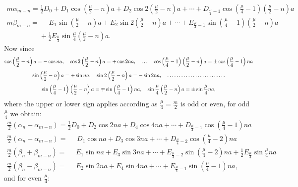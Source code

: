 \begin{landscape}
\[
\begin{array}{l}
m\alpha_{m-n} = \tfrac{1}{2}D_0 + D_1\cos\left(\frac{\mu}{2}-n\right)a + D_2\cos 2\left(\frac{\mu}{2}-n\right)a + \cdots + D_{\frac{\mu}{4}-1}\cos\left(\frac{\mu}{4}-1\right)\left(\frac{\mu}{2}-n\right)a \\[4pt]
m\beta_{m-n} = \phantom{{}={}} E_1\sin\left(\frac{\mu}{2}-n\right)a + E_2\sin 2\left(\frac{\mu}{2}-n\right)a + \cdots + E_{\frac{\mu}{4}-1}\sin\left(\frac{\mu}{4}-1\right)\left(\frac{\mu}{2}-n\right)a \\[4pt]
\phantom{m\beta_{m-n} = {}} + \tfrac{1}{2}E_{\frac{\mu}{4}}\sin\frac{\mu}{4}\left(\frac{\mu}{2}-n\right)a.
\end{array}
\]
Now since
\[
\begin{gathered}
\cos\left(\frac{\mu}{2}-n\right)a = -\cos na, \quad \cos 2\left(\frac{\mu}{2}-n\right)a = +\cos 2na, \quad \ldots \quad \cos\left(\frac{\mu}{4}-1\right)\left(\frac{\mu}{2}-n\right)a = \pm\cos\left(\frac{\mu}{4}-1\right)na\\[4pt]
\sin\left(\frac{\mu}{2}-n\right)a = +\sin na, \quad \sin 2\left(\frac{\mu}{2}-n\right)a = -\sin 2na, \quad \mathord{.}\,\mathord{.}\,\mathord{.}\,\mathord{.}\,\mathord{.}\,\mathord{.}\,\mathord{.}\,\mathord{.}\,\mathord{.}\,\mathord{.}\,\mathord{.}\,\mathord{.}\,\mathord{.}\,\mathord{.}\,\mathord{.}\,\mathord{.}\,\mathord{.}\,\mathord{.}\,\mathord{.}\,\mathord{.}\,\mathord{.}\,\mathord{.}\,\mathord{.}\,\mathord{.}\,\mathord{.}\\[4pt]
\sin\left(\frac{\mu}{4}-1\right)\left(\frac{\mu}{2}-n\right)a = \mp\sin\left(\frac{\mu}{4}-1\right)na, \quad \sin\frac{\mu}{4}\left(\frac{\mu}{2}-n\right)a = \pm\sin\frac{\mu}{4}na,
\end{gathered}
\]
where the upper or lower sign applies according as \(\frac{\mu}{4}=\frac{m}{2}\) is odd or even, for odd \(\frac{\mu}{4}\) we obtain:
\[
\tag*{5)}
\begin{array}{l}
\frac{m}{2}(\alpha_n+\alpha_{m-n}) = \tfrac{1}{2}D_0 + D_2\cos 2na + D_4\cos 4na + \cdots + D_{\frac{\mu}{4}-1}\cos\left(\frac{\mu}{4}-1\right)na \\[4pt]
\frac{m}{2}(\alpha_n-\alpha_{m-n}) = \phantom{{}={}} D_1\cos na + D_3\cos 3na + \cdots + D_{\frac{\mu}{4}-2}\cos\left(\frac{\mu}{4}-2\right)na \\[4pt]
\frac{m}{2}(\beta_n+\beta_{m-n}) = \phantom{{}={}} E_1\sin na + E_3\sin 3na + \cdots + E_{\frac{\mu}{4}-2}\sin\left(\frac{\mu}{4}-2\right)na + \tfrac{1}{2}E_{\frac{\mu}{4}}\sin\frac{\mu}{4}na \\[4pt]
\frac{m}{2}(\beta_n-\beta_{m-n}) = \phantom{{}={}} E_2\sin 2na + E_4\sin 4na + \cdots + E_{\frac{\mu}{4}-1}\sin\left(\frac{\mu}{4}-1\right)na,
\end{array}
\]
and for even \(\frac{\mu}{4}\):
\[
\tag*{6)}
\begin{array}{l}

\end{array}\]
\end{landscape}
